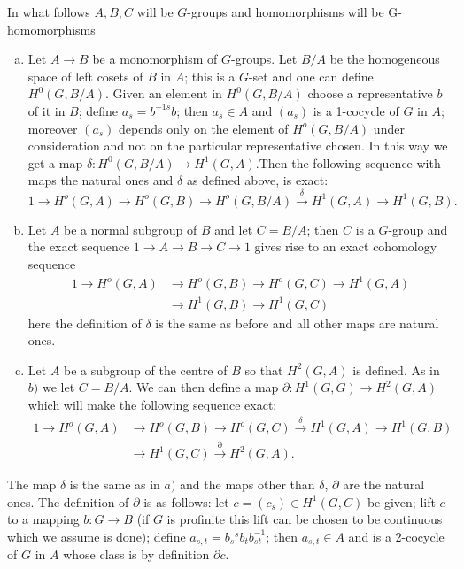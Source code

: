 In what follows $A,B,C$ will be $G$-groups and homomorphisms will be
G-homomorphisms 
\begin{enumerate}[a)]
\item Let $A \rightarrow B$ be a monomorphism of $G$-groups. Let $B/A$
  be the homogeneous space of left cosets of $B$ in $A$; this is a
  $G$-set and one can define $H^0(G,B/A)$. Given an element in
  $H^0(G,B/A)$ choose a representative $b$ of it in $B$; define $a_s =
  b^{-1s}b$; then $a_s\in A$ and $(a_s)$ is a 1-cocycle of $G$ in
  $A$; moreover $(a_s)$ depends only on the element of $H^o(G,B/A)$
  under consideration and not on the particular representative
  chosen. In this way we get a map $\delta : H^0(G,B/A) \rightarrow
  H^1(G,A)$.\pageoriginale Then the following sequence with maps the
  natural ones and $\delta$ as defined above, is exact:  
{\fontsize{10}{12}\selectfont
$$
1\rightarrow H^o(G,A) \rightarrow H^o(G,B) \rightarrow
H^o(G,B/A)\overset{\delta}{\rightarrow} H^1(G,A) \rightarrow
H^1(G,B). 
$$}

\item Let $A$ be a normal subgroup of $B$ and let $C = B/A$; then $C$
  is a $G$-group and the exact sequence $1 \rightarrow A \rightarrow B
  \rightarrow C \rightarrow 1$ gives rise to an exact cohomology
  sequence 
\begin{align*}
1 \rightarrow H^o(G,A) &\rightarrow H^o(G,B) \rightarrow H^o(G,C)
\rightarrow H^1(G,A)\\
& \rightarrow H^1(G,B) \rightarrow H^1(G,C) 
\end{align*}
here the definition of $\delta$ is the same as before and all other
maps are natural ones. 

\item Let $A$ be a subgroup of the centre of $B$ so that $H^2(G,A)$ is
  defined. As in $b)$ we let $C = B/A$. We can then define a map
  $\partial : H^1(G,G) \rightarrow H^2(G,A)$ which will make the
  following sequence exact: 
\begin{align*}
1 \rightarrow H^o(G,A) &\rightarrow H^o(G,B) \rightarrow
H^o(G,C)\overset{\delta}{\rightarrow}H^1(G,A)\rightarrow H^1(G,B)\\
&\rightarrow H^1(G,C) \overset{\partial}{\rightarrow} H^2(G,A). 
\end{align*}
\end{enumerate}

\noindent
The map $\delta$ is the same as in $a)$ and the maps other than
$\delta$, $\partial$ are the natural ones. The definition of $\partial$
is as follows: let $c = (c_s) \in H^1(G,C)$ be given; lift $c$ to a
mapping $b:G\rightarrow B$ (if $G$ is profinite this lift can be
chosen to be continuous which we assume is done); define $a_{s,t} =
b_s {}^{s}b_t b^{-1}_{st}$; then $a_{s,t} \in A$ and is a 2-cocycle of
$G$ in $A$ whose class is by definition $\partial c$. 

